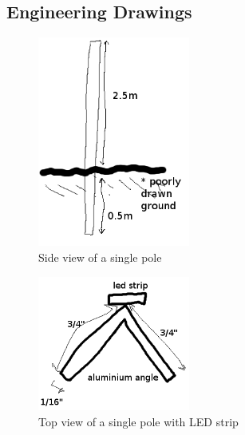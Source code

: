 \documentclass[12pt]{article} %
\begin{document}
\clearpage
\begin{appendices}
\section{Engineering Drawings}
\label{app:engdrawings}

\begin{figure}[h]
    \centering
    \includegraphics[width=5cm]{diags/sidepole.png}
    \caption{Side view of a single pole}
\end{figure}

\begin{figure}[h]
    \centering
    \includegraphics[width=5cm]{diags/toppole.png}
    \caption{Top view of a single pole with LED strip}
\end{figure}

\end{appendices}
\end{document}

